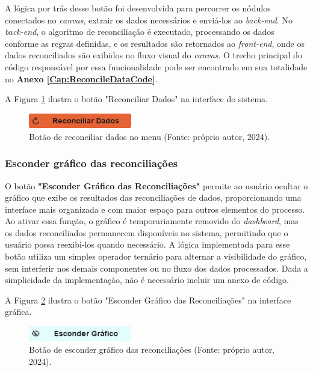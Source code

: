 A lógica por trás desse botão foi desenvolvida para percorrer os nódulos conectados no \textit{canvas}, extrair os dados necessários e enviá-los ao \textit{back-end}. No \textit{back-end}, o algoritmo de reconciliação é executado, processando os dados conforme as regras definidas, e os resultados são retornados ao \textit{front-end}, onde os dados reconciliados são exibidos no fluxo visual do \textit{canvas}. O trecho principal do código responsável por essa funcionalidade pode ser encontrado em sua totalidade no \textbf{Anexo \ref{Cap:ReconcileDataCode}}.

A Figura \ref{Fig:ReconcileButton} ilustra o botão "Reconciliar Dados" na interface do sistema.

\begin{figure}[htbp]
    \centering
    \includegraphics[width=0.4\textwidth]{figuras/reconcile-data-button.png}
    \caption{Botão de reconciliar dados no menu (Fonte: próprio autor, 2024).}
    \label{Fig:ReconcileButton}
\end{figure}

\subsubsection{Esconder gráfico das reconciliações}

O botão \textbf{"Esconder Gráfico das Reconciliações"} permite ao usuário ocultar o gráfico que exibe os resultados das reconciliações de dados, proporcionando uma interface mais organizada e com maior espaço para outros elementos do processo. Ao ativar essa função, o gráfico é temporariamente removido do \textit{dashboard}, mas os dados reconciliados permanecem disponíveis no sistema, permitindo que o usuário possa reexibi-los quando necessário. A lógica implementada para esse botão utiliza um simples operador ternário para alternar a visibilidade do gráfico, sem interferir nos demais componentes ou no fluxo dos dados processados. Dada a simplicidade da implementação, não é necessário incluir um anexo de código.

A Figura \ref{Fig:Recon} ilustra o botão "Esconder Gráfico das Reconciliações" na interface gráfica.

\begin{figure}[htbp] \centering \includegraphics[width=0.4\textwidth]{figuras/hide-graphbar-button.png} \caption{Botão de esconder gráfico das reconciliações (Fonte: próprio autor, 2024).} \label{Fig:Recon} \end{figure}

